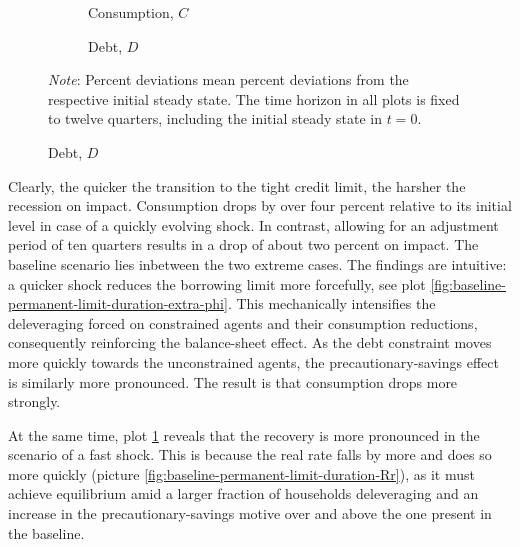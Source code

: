 \documentclass[a4paper,12pt]{article} %
\numberwithin{equation}{section} %
\numberwithin{figure}{section}
\numberwithin{table}{section}
\begin{document}
\begin{figure}[t]
    \centering
    \caption{Baseline Model -- Varying the Duration of a Credit Crunch}
    \label{fig:baseline-permanent-limit-duration}
     \begin{subfigure}[b]{0.49\textwidth}
     \caption{Consumption, $C$}
     \label{fig:baseline-permanent-limit-duration-C}
         \centering
         
     \end{subfigure}
     \hfill
     \begin{subfigure}[b]{0.49\textwidth}
     \caption{Debt, $D$}
     \label{fig:baseline-permanent-limit-duration-D}
         \centering
         
     \end{subfigure}

    \vspace{10pt}
     
     \justifying
     \footnotesize
	\textit{Note}: Percent deviations mean percent deviations from the respective initial steady state. The time horizon in all plots is fixed to twelve quarters, including the initial steady state in $t=0$.
\end{figure}

Clearly, the quicker the transition to the tight credit limit, the harsher the recession on impact. Consumption drops by over four percent relative to its initial level in case of a quickly evolving shock. In contrast, allowing for an adjustment period of ten quarters results in a drop of about two percent on impact. The baseline scenario lies inbetween the two extreme cases. The findings are intuitive: a quicker shock reduces the borrowing limit more forcefully, see plot \ref{fig:baseline-permanent-limit-duration-extra-phi}. This mechanically intensifies the deleveraging forced on constrained agents and their consumption reductions, consequently reinforcing the balance-sheet effect. As the debt constraint moves more quickly towards the unconstrained agents, the precautionary-savings effect is similarly more pronounced. The result is that consumption drops more strongly. 

At the same time, plot \ref{fig:baseline-permanent-limit-duration-C} reveals that the recovery is more pronounced in the scenario of a fast shock. This is because the real rate falls by more and does so more quickly (picture \ref{fig:baseline-permanent-limit-duration-Rr}), as it must achieve equilibrium amid a larger fraction of households deleveraging and an increase in the precautionary-savings motive over and above the one present in the baseline.
\end{document}

